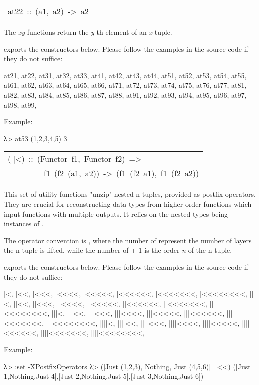 \begin{haddockdesc}
\item[\begin{tabular}{@{}l}
at22\ ::\ (a1,\ a2)\ ->\ a2
\end{tabular}]\haddockbegindoc
The \emph{xy} functions return the \emph{y}-th element of an \emph{x}-tuple.\par
{} exports the constructors below. Please
 follow the examples in the source code if they do not suffice:\par
\begin{code}
at21, at22,
at31, at32, at33,
at41, at42, at43, at44,
at51, at52, at53, at54, at55,
at61, at62, at63, at64, at65, at66, 
at71, at72, at73, at74, at75, at76, at77,
at81, at82, at83, at84, at85, at86, at87, at88,
at91, at92, at93, at94, at95, at96, at97, at98, at99,\end{code}
Example:\par
\begin{interactive}
λ> at53 (1,2,3,4,5)
3

\end{interactive}

\item[\begin{tabular}{@{}l}
(||<)\ ::\ (Functor\ f1,\ Functor\ f2)\ =>\\\ \ \ \ \ \ \ \ \ f1\ (f2\ (a1,\ a2))\ ->\ (f1\ (f2\ a1),\ f1\ (f2\ a2))
\end{tabular}]\haddockbegindoc
This set of utility functions "unzip" nested n-tuples, provided
 as postfix operators. They are crucial for reconstructing data
 types from higher-order functions which input functions with
 multiple outputs. It relies on the nested types being instances of
 .\par
The operator convention is \haddocktt{(|+<+)}, where the number of \haddocktt{|}
 represent the number of layers the n-tuple is lifted, while the
 number of \haddocktt{<} + 1 is the order \emph{n} of the n-tuple.\par
{} exports the constructors below. Please
 follow the examples in the source code if they do not suffice:\par
\begin{code}
   |<,    |<<,    |<<<,    |<<<<,    |<<<<<,    |<<<<<<,    |<<<<<<<,    |<<<<<<<<,
  ||<,   ||<<,   ||<<<,   ||<<<<,   ||<<<<<,   ||<<<<<<,   ||<<<<<<<,   ||<<<<<<<<,
 |||<,  |||<<,  |||<<<,  |||<<<<,  |||<<<<<,  |||<<<<<<,  |||<<<<<<<,  |||<<<<<<<<,  
||||<, ||||<<, ||||<<<, ||||<<<<, ||||<<<<<, ||||<<<<<<, ||||<<<<<<<, ||||<<<<<<<<, \end{code}
Example:\par
\begin{interactive}
λ> :set -XPostfixOperators
λ> ([Just (1,2,3), Nothing, Just (4,5,6)] ||<<)
([Just 1,Nothing,Just 4],[Just 2,Nothing,Just 5],[Just 3,Nothing,Just 6])


\end{interactive}
\end{haddockdesc}
